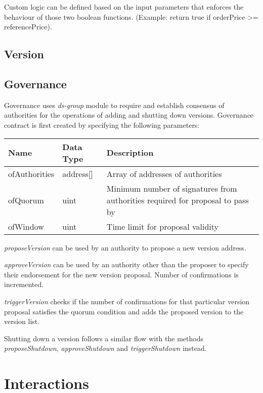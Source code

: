 \documentclass[conference]{IEEEtran}
\begin{document}
Custom logic can be defined based on the input parameters that enforces the behaviour of those two boolean functions. (Example: return true if orderPrice >= referencePrice). 

\subsection{Version}

\subsection{Governance}

Governance uses \textit{ds-group} module to require and establish consensus of authorities for the operations of adding and shutting down versions. Governance contract is first created by specifying the following parameters:

\begin{center}
	\footnotesize
	\begin{tabular}{ | p{2cm} | p{1.2cm} | p{4cm} | }
		\hline
		Name & Data Type & Description \\ \hline
		ofAuthorities & address[] & Array of addresses of authorities \\ \hline
		ofQuorum & uint & Minimum number of signatures from authorities required for proposal to pass by \\ \hline
		ofWindow & uint & Time limit for proposal validity \\ \hline
	\end{tabular}
\end{center}


\textit{proposeVersion} can be used by an authority to propose a new version address.

\textit{approveVersion} can be used by an authority other than the proposer to specify their endorsement for the new version proposal.  Number of confirmations is incremented.

\textit{triggerVersion} checks if the number of confirmations for that particular version proposal satisfies the quorum condition and adds the proposed version to the version list. 

Shutting down a version follows a similar flow with the methods \textit{proposeShutdown}, \textit{approveShutdown} and \textit{triggerShutdown} instead.

\section{Interactions}
\end{document}
